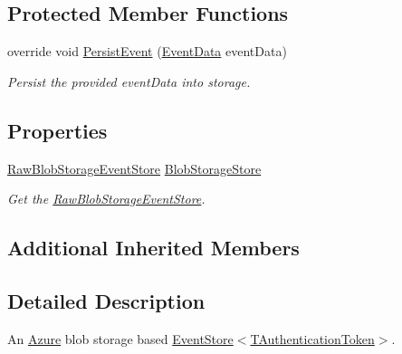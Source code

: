 \subsection*{Protected Member Functions}
\begin{DoxyCompactItemize}
\item 
override void \hyperlink{classCqrs_1_1Azure_1_1BlobStorage_1_1Events_1_1BlobStorageEventStore_aa27a352076b8967498407d24814f7c83_aa27a352076b8967498407d24814f7c83}{Persist\+Event} (\hyperlink{classCqrs_1_1Events_1_1EventData}{Event\+Data} event\+Data)
\begin{DoxyCompactList}\small\item\em Persist the provided {\itshape event\+Data}  into storage. \end{DoxyCompactList}\end{DoxyCompactItemize}
\subsection*{Properties}
\begin{DoxyCompactItemize}
\item 
\hyperlink{classCqrs_1_1Azure_1_1BlobStorage_1_1Events_1_1BlobStorageEventStore_1_1RawBlobStorageEventStore}{Raw\+Blob\+Storage\+Event\+Store} \hyperlink{classCqrs_1_1Azure_1_1BlobStorage_1_1Events_1_1BlobStorageEventStore_a85b9d71c130e5748886a61d80447116d_a85b9d71c130e5748886a61d80447116d}{Blob\+Storage\+Store}
\begin{DoxyCompactList}\small\item\em Get the \hyperlink{classCqrs_1_1Azure_1_1BlobStorage_1_1Events_1_1BlobStorageEventStore_1_1RawBlobStorageEventStore}{Raw\+Blob\+Storage\+Event\+Store}. \end{DoxyCompactList}\end{DoxyCompactItemize}
\subsection*{Additional Inherited Members}


\subsection{Detailed Description}
An \hyperlink{namespaceCqrs_1_1Azure}{Azure} blob storage based \hyperlink{classCqrs_1_1Events_1_1EventStore_a6346cb2aea4c5b4e740dc6cfb15abab8_a6346cb2aea4c5b4e740dc6cfb15abab8}{Event\+Store$<$\+T\+Authentication\+Token$>$}. 


